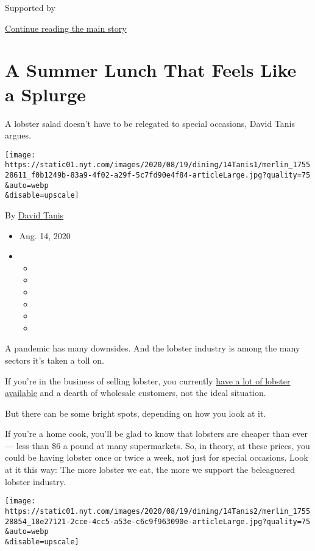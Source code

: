 Supported by

\protect\hyperlink{after-sponsor}{Continue reading the main story}

\hypertarget{a-summer-lunch-that-feels-like-a-splurge}{%
\section{A Summer Lunch That Feels Like a
Splurge}\label{a-summer-lunch-that-feels-like-a-splurge}}

A lobster salad doesn't have to be relegated to special occasions, David
Tanis argues.

\texttt{[image: https://static01.nyt.com/images/2020/08/19/dining/14Tanis1/merlin\_175528611\_f0b1249b-83a9-4f02-a29f-5c7fd90e4f84-articleLarge.jpg?quality=75\\\&auto=webp\\\&disable=upscale]}

By \href{https://www.nytimes.com/by/david-tanis}{David Tanis}

\begin{itemize}
\item
  Aug. 14, 2020
\item
  \begin{itemize}
  \item
  \item
  \item
  \item
  \item
  \item
  \end{itemize}
\end{itemize}

A pandemic has many downsides. And the lobster industry is among the
many sectors it's taken a toll on.

If you're in the business of selling lobster, you currently
\href{https://www.nytimes.com/2020/07/03/us/maine-lobster-summer-virus.html}{have
a lot of lobster available} and a dearth of wholesale customers, not the
ideal situation.

But there can be some bright spots, depending on how you look at it.

If you're a home cook, you'll be glad to know that lobsters are cheaper
than ever --- less than \$6 a pound at many supermarkets. So, in theory,
at these prices, you could be having lobster once or twice a week, not
just for special occasions. Look at it this way: The more lobster we
eat, the more we support the beleaguered lobster industry.

\texttt{[image: https://static01.nyt.com/images/2020/08/19/dining/14Tanis2/merlin\_175528854\_18e27121-2cce-4cc5-a53e-c6c9f963090e-articleLarge.jpg?quality=75\\\&auto=webp\\\&disable=upscale]}

